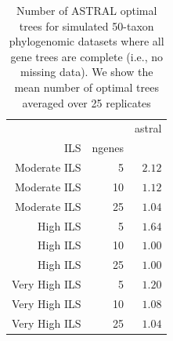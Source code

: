 \begin{table}
\centering
\begin{tabular}{|rr|r|}
 
\hline
 & & astral\\
ILS&ngenes&\\


\hline 
\hline
Moderate ILS&5&	$2.12$\\
Moderate ILS&10	&$1.12$\\
Moderate ILS&25	&$1.04$\\
\hline
High ILS&5&	$1.64$\\
High ILS&10&	$1.00$\\
High ILS&25&	$1.00$\\
\hline
Very High ILS&5	&$1.20$\\
Very High ILS&10	&$1.08$\\
Very High ILS&25	&$1.04$\\
\hline
\end{tabular}

\caption[Number of ASTRAL optimal trees for simulated
  50-taxon phylogenomic datasets where all gene trees are complete (i.e., no missing data)]{Number of ASTRAL optimal trees for simulated
  50-taxon phylogenomic datasets where all gene trees are complete (i.e., no missing data). We show the mean number
  of optimal trees averaged over 25 replicates} \label{astral_counts}
\end{table}



